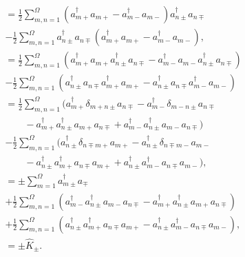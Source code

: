 \documentclass[
a4paper,
10pt,
twoside,
]{article}
\begin{document}
\begin{align}
	[\hat{K}_3,\hat{K}_\pm]
		&= \frac{1}{2} \sum_{m,n=1}^\Omega (a_{m+}^\dagger a_{m+}-a_{m-}^\dagger a_{m-}) a_{n\pm}^\dagger a_{n\mp} \nonumber\\
		&- \frac{1}{2} \sum_{m,n=1}^\Omega a_{n\pm}^\dagger a_{n\mp} (a_{m+}^\dagger a_{m+}-a_{m-}^\dagger a_{m-}),\\
		&= \frac{1}{2} \sum_{m,n=1}^\Omega (a_{m+}^\dagger a_{m+} a_{n\pm}^\dagger a_{n\mp} - a_{m-}^\dagger a_{m-} a_{n\pm}^\dagger a_{n\mp}) \nonumber\\
		&- \frac{1}{2} \sum_{m,n=1}^\Omega (a_{n\pm}^\dagger a_{n\mp} a_{m+}^\dagger a_{m+} - a_{n\pm}^\dagger a_{n\mp} a_{m-}^\dagger a_{m-})\\
		&= \frac{1}{2} \sum_{m,n=1}^\Omega (a_{m+}^\dagger \delta_{m+n\pm} a_{n\mp} - a_{m-}^\dagger \delta_{m-n\pm} a_{n\mp} \nonumber\\
		&\qquad - a_{m+}^\dagger a_{n\pm}^\dagger a_{m+} a_{n\mp} + a_{m-}^\dagger a_{n\pm}^\dagger a_{m-} a_{n\mp}) \nonumber\\
		&- \frac{1}{2} \sum_{m,n=1}^\Omega (a_{n\pm}^\dagger \delta_{n\mp m+} a_{m+} - a_{n\pm}^\dagger \delta_{n\mp m-}a_{m-} \nonumber\\
		&\qquad - a_{n\pm}^\dagger a_{m+}^\dagger a_{n\mp} a_{m+} + a_{n\pm}^\dagger a_{m-}^\dagger a_{n\mp} a_{m-}),\\
		&= \pm \sum_{m=1}^\Omega a_{m\pm}^\dagger a_{\mp} \nonumber\\
		&+ \frac{1}{2} \sum_{m,n=1}^\Omega (a_{m-}^\dagger a_{n\pm}^\dagger a_{m-} a_{n\mp} - a_{m+}^\dagger a_{n\pm}^\dagger a_{m+} a_{n\mp}) \nonumber\\
		&+ \frac{1}{2} \sum_{m,n=1}^\Omega (a_{n\pm}^\dagger a_{m+}^\dagger a_{n\mp} a_{m+} - a_{n\pm}^\dagger a_{m-}^\dagger a_{n\mp} a_{m-}),\\
		&= \pm \hat{K}_\pm.
\end{align}

\stopmcols
\end{document}
